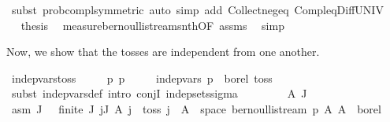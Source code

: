 \begin{isabellebody}
\ {\isacharparenleft}{\kern0pt}subst\ prob{\isacharunderscore}{\kern0pt}compl{\isacharbrackleft}{\kern0pt}symmetric{\isacharbrackright}{\kern0pt}{\isacharcomma}{\kern0pt}\ auto\ simp\ add{\isacharcolon}{\kern0pt}\ Collect{\isacharunderscore}{\kern0pt}neg{\isacharunderscore}{\kern0pt}eq\ Compl{\isacharunderscore}{\kern0pt}eq{\isacharunderscore}{\kern0pt}Diff{\isacharunderscore}{\kern0pt}UNIV{\isacharparenright}{\kern0pt}\isanewline
\ \ \isamarkupfalse%
\ \isamarkupfalse%
\ {\isacharquery}{\kern0pt}thesis\ \isamarkupfalse%
\ measure{\isacharunderscore}{\kern0pt}bernoulli{\isacharunderscore}{\kern0pt}stream{\isacharunderscore}{\kern0pt}snth{\isacharbrackleft}{\kern0pt}OF\ assms{\isacharbrackright}{\kern0pt}\ \isamarkupfalse%
\ simp\isanewline
{}\isamarkupfalse%
%
\endisatagproof
{\isafoldproof}%
%
\isadelimproof
%
\endisadelimproof
%
\begin{isamarkuptext}%
Now, we show that the tosses are independent from one another.%
\end{isamarkuptext}\isamarkuptrue%
\isamarkupfalse%
\ indep{\isacharunderscore}{\kern0pt}vars{\isacharunderscore}{\kern0pt}toss{\isacharcolon}{\kern0pt}\isanewline
\ \ \ {\isachardoublequoteopen}{}\ {\isasymle}\ p{\isachardoublequoteclose}\ {\isachardoublequoteopen}p\ {\isasymle}\ {}{\isachardoublequoteclose}\isanewline
\ \ \ {\isachardoublequoteopen}indep{\isacharunderscore}{\kern0pt}vars\ p\ {\isacharparenleft}{\kern0pt}{\isasymlambda}{\isacharunderscore}{\kern0pt}{\isachardot}{\kern0pt}\ borel{\isacharparenright}{\kern0pt}\ toss\ {\isacharbraceleft}{\kern0pt}{}{\isachardot}{\kern0pt}{\isachardot}{\kern0pt}{\isacharbraceright}{\kern0pt}{\isachardoublequoteclose}\isanewline
%
\isadelimproof
%
\endisadelimproof
%
\isatagproof
{}\isamarkupfalse%
\ {\isacharparenleft}{\kern0pt}subst\ indep{\isacharunderscore}{\kern0pt}vars{\isacharunderscore}{\kern0pt}def{\isacharcomma}{\kern0pt}\ intro\ conjI\ indep{\isacharunderscore}{\kern0pt}sets{\isacharunderscore}{\kern0pt}sigma{\isacharparenright}{\kern0pt}\isanewline
\ \ \isacommand{{\isacharbraceleft}{\kern0pt}}\isamarkupfalse%
\isanewline
\ \ \ \ \isamarkupfalse%
\ A\ J\ \isamarkupfalse%
\ asm{\isacharcolon}{\kern0pt}\ {\isachardoublequoteopen}J\ {\isasymnoteq}\ {\isacharbraceleft}{\kern0pt}{\isacharbraceright}{\kern0pt}{\isachardoublequoteclose}\ {\isachardoublequoteopen}finite\ J{\isachardoublequoteclose}\ {\isachardoublequoteopen}{\isasymforall}j{\isasymin}J{\isachardot}{\kern0pt}\ A\ j\ {\isasymin}\ {\isacharbraceleft}{\kern0pt}toss\ j\ {\isacharminus}{\kern0pt}{\isacharbackquote}{\kern0pt}\ A\ {\isasyminter}\ space\ {\isacharparenleft}{\kern0pt}bernoulli{\isacharunderscore}{\kern0pt}stream\ p{\isacharparenright}{\kern0pt}\ {\isacharbar}{\kern0pt}A{\isachardot}{\kern0pt}\ A\ {\isasymin}\ borel{\isacharbraceright}{\kern0pt}{\isachardoublequoteclose}\isanewline

\end{isabellebody}
